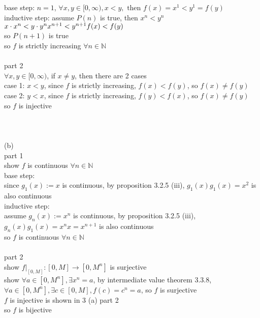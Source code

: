 \documentclass[12pt, border = 4pt, multi]{article} %
\begin{document}
base step: $n = 1$, $\forall x, y \in [0, \infty), x < y, \text{ then } f(x) = x ^ 1 < y ^ 1 = f(y)$\\
inductive step: assume $P(n)$ is true, then $x ^ n < y ^ n$\\
$x \cdot x ^ n < y \cdot y ^ n\\
x ^ {n + 1} < y ^ {n + 1}\\
f(x) < f(y)$\\
so $P(n + 1)$ is true\\
so $f$ is strictly increasing $\forall n \in \mathbb{N}$\\
\\
part 2\\
$\forall x, y \in [0, \infty)$, if $x \not= y$, then there are 2 cases\\
case 1: $x < y$, since $f$ is strictly increasing, $f(x) < f(y)$, so $f(x) \not= f(y)$\\
case 2: $y < x$, since $f$ is strictly increasing, $f(y) < f(x)$, so $f(x) \not= f(y)$\\
so $f$ is injective\\
\\
\\
\\
(b)\\
part 1\\
show $f$ is continuous $\forall n \in \mathbb{N}$\\
base step:\\
since $g_1(x) := x$ is continuous, by proposition 3.2.5 (iii), $g_1(x)g_1(x) = x ^ 2$ is also continuous\\
inductive step:\\
assume $g_n(x) := x ^ n$ is continuous, by proposition 3.2.5 (iii), $g_n(x)g_1(x) = x ^ n x = x ^ {n + 1}$ is also continuous\\
so $f$ is continuous $\forall n \in \mathbb{N}$\\
\\
part 2\\
show $f|_{[0, M]}: [0, M] \rightarrow [0, M ^ n]$ is surjective\\
show $\forall a \in [0, M ^ n], \exists x ^ n = a$, by intermediate value theorem 3.3.8, $\forall a \in [0, M ^ n], \exists c \in [0, M], f(c) = c ^ n = a$, so $f$ is surjective\\
$f$ is injective is shown in 3 (a) part 2\\
so $f$ is bijective\\
\\
\\
\end{document}
